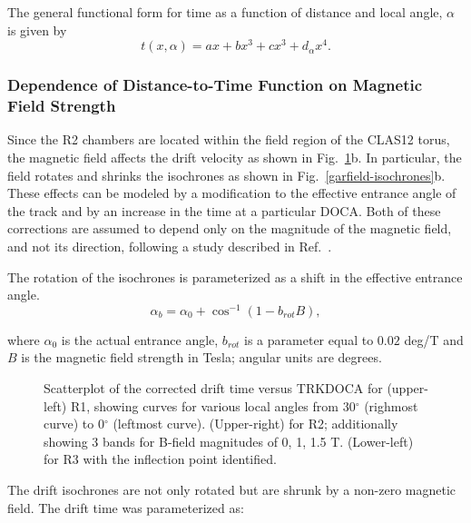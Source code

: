 The general functional form for time as a function of distance and local angle, $\alpha$
is given by
\begin{equation}
\label{tfunctionofxandlocalangle}
t(x,\alpha) = a x + b x^3 + c x^3 + d_{\alpha} x^4.
\end{equation}

\subsubsection{Dependence of Distance-to-Time Function on Magnetic Field Strength}

Since the R2 chambers are located within the field region of the CLAS12 torus, the 
magnetic field affects the drift velocity as shown in 
Fig.~\ref{xvst}b.  In particular, the field rotates and shrinks the isochrones
as shown in Fig.~\ref{garfield-isochrones}b.  These effects can be modeled by a 
modification to the effective entrance angle of the track and by an increase 
in the time at a particular DOCA.  Both of these corrections are assumed to depend only on the 
magnitude of the magnetic field, and not its direction, following a study 
described in Ref.~\cite{MM-IEEE}.  

The rotation of the isochrones is parameterized as a shift in the effective
entrance angle.  
\begin{equation} 
\label{eq-bcorrn-to-ang}
\alpha_b = \alpha_0 + \cos^{-1}(1 - b_{rot} B), 
\end{equation}

where $\alpha_0$ is the actual entrance angle, $b_{rot}$ is a parameter equal to $0.02$ deg/T and $B$ is the magnetic field strength in Tesla; angular
units are degrees.

\begin{figure}[htb]
\vspace{10.0cm} 
\caption{\small{Scatterplot of the corrected drift time versus TRKDOCA for 
(upper-left) R1, showing curves for various local angles from 30$^{\circ}$
(righmost curve) to 0$^{\circ}$ (leftmost curve).  (Upper-right) for R2; 
additionally showing 3 bands for B-field magnitudes of 0, 1, 1.5 T.
(Lower-left) for R3 with the inflection point identified.}}
\label{xvst}
\end{figure}

The drift isochrones are not only rotated but are shrunk by a non-zero magnetic field.
The drift time was parameterized as:

